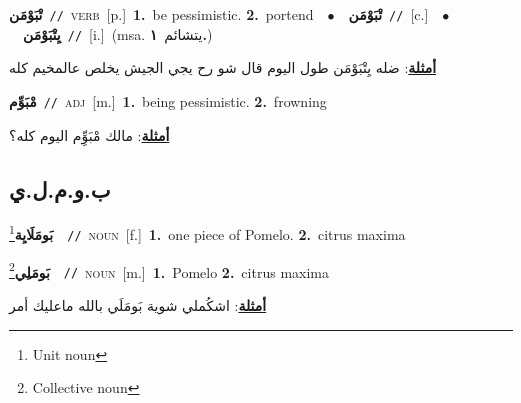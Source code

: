 \documentclass[10pt,a4paper,twoside]{article} %
\begin{document}
\begin{multicols}{2}
{\setlength\topsep{0pt}\textbf{\foreignlanguage{arabic}{تْبَوْمَن}}\ {\color{gray}\texttt{//}\color{black}}\ \textsc{verb}\ [p.]\ \textbf{1.}~be pessimistic.  \textbf{2.}~portend\ \ $\bullet$\ \ \setlength\topsep{0pt}\textbf{\foreignlanguage{arabic}{تْبَوْمَن}}\ {\color{gray}\texttt{//}\color{black}}\ [c.]\ \ $\bullet$\ \ \setlength\topsep{0pt}\textbf{\foreignlanguage{arabic}{يِتْبَوْمَن}}\ {\color{gray}\texttt{//}\color{black}}\ [i.]\ \color{gray}(msa. \foreignlanguage{arabic}{يتشائم}~\foreignlanguage{arabic}{\textbf{١.}})\color{black}\  \begin{flushright}\color{gray}\foreignlanguage{arabic}{\textbf{\underline{\foreignlanguage{arabic}{أمثلة}}}: ضله يِتْبَوْمَن طول اليوم قال شو رح يجي الجيش يخلص عالمخيم كله}\end{flushright}\color{black}} \vspace{2mm}

{\setlength\topsep{0pt}\textbf{\foreignlanguage{arabic}{مْبَوِّم}}\ {\color{gray}\texttt{//}\color{black}}\ \textsc{adj}\ [m.]\ \textbf{1.}~being pessimistic.  \textbf{2.}~frowning\  \begin{flushright}\color{gray}\foreignlanguage{arabic}{\textbf{\underline{\foreignlanguage{arabic}{أمثلة}}}: مالك مْبَوِِّم اليوم كله؟}\end{flushright}\color{black}} \vspace{2mm}

\vspace{-3mm}
\subsection*{\color{blue}\foreignlanguage{arabic}{ب.و.م.ل.ي}\color{blue}{ (ntws)}} 

{\setlength\topsep{0pt}\textbf{\foreignlanguage{arabic}{بَومَلَايِة}}\footnote{Unit noun}\ \ {\color{gray}\texttt{//}\color{black}}\ \textsc{noun}\ [f.]\ \textbf{1.}~one piece of Pomelo.  \textbf{2.}~citrus maxima\ } \vspace{2mm}

{\setlength\topsep{0pt}\textbf{\foreignlanguage{arabic}{بَومَلِي}}\footnote{Collective noun}\ \ {\color{gray}\texttt{//}\color{black}}\ \textsc{noun}\ [m.]\ \textbf{1.}~Pomelo  \textbf{2.}~citrus maxima\  \begin{flushright}\color{gray}\foreignlanguage{arabic}{\textbf{\underline{\foreignlanguage{arabic}{أمثلة}}}: اشكُملي شوية بَومَلَي بالله ماعليك أمر}\end{flushright}\color{black}} \vspace{2mm}


\end{multicols}
\end{document}
